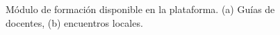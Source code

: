 \documentclass[a4paper]{article}
\begin{document}
\begin{figure}[tbp]
  \centering
	  \hspace{1mm}
  \caption{Módulo de formación disponible en la plataforma. (a) Guías de docentes, (b) encuentros locales.}
  \label{fig:formacion}
\end{figure}
\end{document}
